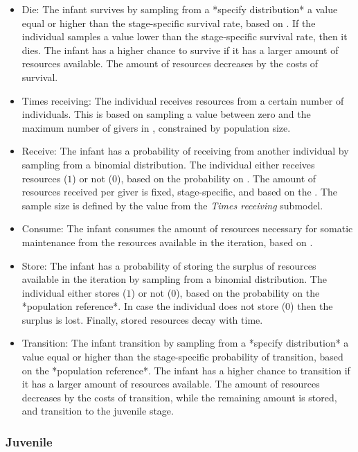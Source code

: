 \documentclass{article}
\begin{document}
\begin{itemize}
    \item Die: The infant survives by sampling from a *specify distribution* a value equal or higher than the stage-specific survival rate, based on \cite{gurven2007longevity}. If the individual samples a value lower than the stage-specific survival rate, then it dies. The infant has a higher chance to survive if it has a larger amount of resources available. The amount of resources decreases by the costs of survival.
    \item Times receiving: The individual receives resources from a certain number of individuals. This is based on sampling a value between zero and the maximum number of givers in \cite{gurven2004give}, constrained by population size.
    \item Receive: The infant has a probability of receiving from another individual by sampling from a binomial distribution. The individual either receives resources ($1$) or not ($0$), based on the probability on \cite{gurven2004give}. The amount of resources received per giver is fixed, stage-specific, and based on the \cite{gurven2004give}. The sample size is defined by the value from the \emph{Times receiving} submodel. 
    \item Consume: The infant consumes the amount of resources necessary for somatic maintenance from the resources available in the iteration, based on \cite{kaplan2000theory}.
    \item Store: The infant has a probability of storing the surplus of resources available in the iteration by sampling from a binomial distribution. The individual either stores ($1$) or not ($0$), based on the probability on the *population reference*. In case the individual does not store ($0$) then the surplus is lost. Finally, stored resources decay with time.
    \item Transition: The infant transition by sampling from a *specify distribution* a value equal or higher than the stage-specific probability of transition, based on the *population reference*. The infant has a higher chance to transition if it has a larger amount of resources available. The amount of resources decreases by the costs of transition, while the remaining amount is stored, and transition to the juvenile stage.
\end{itemize}

\subsubsection{Juvenile}
\end{document}
